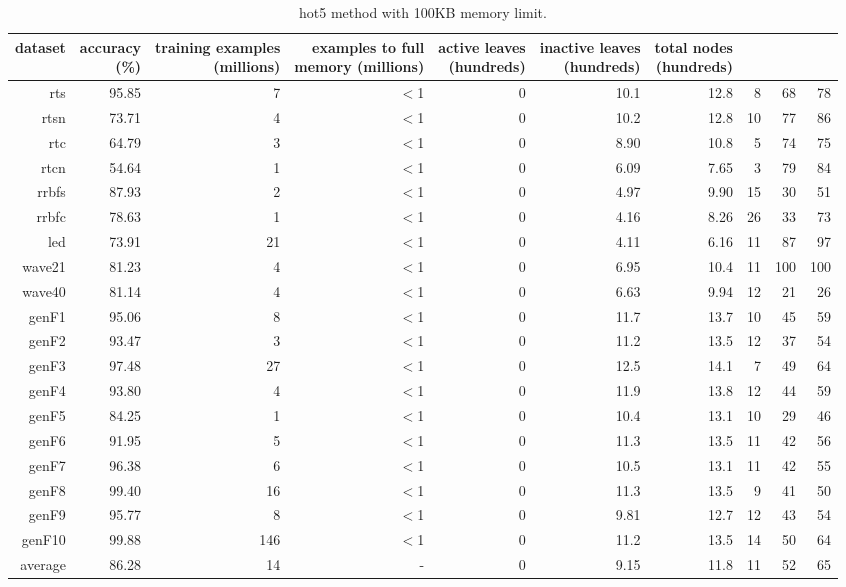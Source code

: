 \clearpage
\begin{table}
\caption{{\sc hot5} method with 100KB memory limit.}
\label{tab:hot5-100k}
\centering
\begin{tabular}{|r|r|r|r|r|r|r|r|r|r|}
\hline
dataset	&
\rotatebox{90}{\parbox{9em}{accuracy\\(\%)}} &
\rotatebox{90}{\parbox{9em}{training examples\\(millions)}} &
\rotatebox{90}{\parbox{9em}{examples to full\\memory (millions)}} &
\rotatebox{90}{\parbox{9em}{active leaves\\(hundreds)}} &
\rotatebox{90}{\parbox{9em}{inactive leaves\\(hundreds)}} &
\rotatebox{90}{\parbox{9em}{total nodes\\(hundreds)}} &
\rotatebox{90}{\parbox{9em}{tree depth}}	&
\rotatebox{90}{\parbox{9em}{training speed (\%)}} &
\rotatebox{90}{\parbox{9em}{prediction speed (\%)}} \\
\hline
{\sc rts} & 95.85 & 7 & $<$1 & 0 & 10.1 & 12.8 & 8 & 68 & 78 \\
{\sc rtsn} & 73.71 & 4 & $<$1 & 0 & 10.2 & 12.8 & 10 & 77 & 86 \\
{\sc rtc} & 64.79 & 3 & $<$1 & 0 & 8.90 & 10.8 & 5 & 74 & 75 \\
{\sc rtcn} & 54.64 & 1 & $<$1 & 0 & 6.09 & 7.65 & 3 & 79 & 84 \\
{\sc rrbfs} & 87.93 & 2 & $<$1 & 0 & 4.97 & 9.90 & 15 & 30 & 51 \\
{\sc rrbfc} & 78.63 & 1 & $<$1 & 0 & 4.16 & 8.26 & 26 & 33 & 73 \\
{\sc led} & 73.91 & 21 & $<$1 & 0 & 4.11 & 6.16 & 11 & 87 & 97 \\
{\sc wave21} & 81.23 & 4 & $<$1 & 0 & 6.95 & 10.4 & 11 & 100 & 100 \\
{\sc wave40} & 81.14 & 4 & $<$1 & 0 & 6.63 & 9.94 & 12 & 21 & 26 \\
{\sc genF1} & 95.06 & 8 & $<$1 & 0 & 11.7 & 13.7 & 10 & 45 & 59 \\
{\sc genF2} & 93.47 & 3 & $<$1 & 0 & 11.2 & 13.5 & 12 & 37 & 54 \\
{\sc genF3} & 97.48 & 27 & $<$1 & 0 & 12.5 & 14.1 & 7 & 49 & 64 \\
{\sc genF4} & 93.80 & 4 & $<$1 & 0 & 11.9 & 13.8 & 12 & 44 & 59 \\
{\sc genF5} & 84.25 & 1 & $<$1 & 0 & 10.4 & 13.1 & 10 & 29 & 46 \\
{\sc genF6} & 91.95 & 5 & $<$1 & 0 & 11.3 & 13.5 & 11 & 42 & 56 \\
{\sc genF7} & 96.38 & 6 & $<$1 & 0 & 10.5 & 13.1 & 11 & 42 & 55 \\
{\sc genF8} & 99.40 & 16 & $<$1 & 0 & 11.3 & 13.5 & 9 & 41 & 50 \\
{\sc genF9} & 95.77 & 8 & $<$1 & 0 & 9.81 & 12.7 & 12 & 43 & 54 \\
{\sc genF10} & 99.88 & 146 & $<$1 & 0 & 11.2 & 13.5 & 14 & 50 & 64 \\
\hline
average & 86.28 & 14 &  -  & 0 & 9.15 & 11.8 & 11 & 52 & 65 \\
\hline
\end{tabular}
\end{table}
